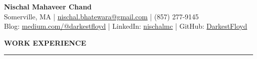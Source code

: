 \documentclass[a4paper]{article}
\newcommand{\myline}{\par
  \kern2pt %
  \hrule height 0.5pt
  \kern2pt %
}
\begin{document}
	\begin{center}
		{\LARGE \textbf{Nischal Mahaveer Chand}} \\
    Somerville, MA | 
    \href{mailto:nischal.bhatewara@gmail.com}{nischal.bhatewara@gmail.com} | 
    (857) 277-9145 \\
		Blog: \href{https://medium.com/@darkestfloyd}{medium.com/@darkestfloyd} |
                LinkedIn: \href{https://www.linkedin.com/in/nischalmc}{nischalmc} |
                GitHub: \href{https://github.com/darkestfloyd}{DarkestFloyd} \\
	\end{center}
	


	\smallskip
	\smallskip
	\noindent
	{\large \textbf{WORK EXPERIENCE}}
	\myline 
	\smallskip
	
\end{document}
